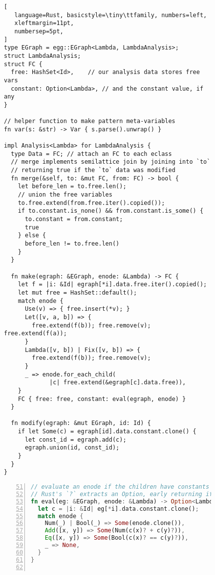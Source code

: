 \begin{figure}
\begin{minipage}[t]{0.49\linewidth}
  \begin{lstlisting}[
   language=Rust, basicstyle=\tiny\ttfamily, numbers=left,
   xleftmargin=11pt,
   numbersep=5pt,
]
type EGraph = egg::EGraph<Lambda, LambdaAnalysis>;
struct LambdaAnalysis;
struct FC {
  free: HashSet<Id>,    // our analysis data stores free vars
  constant: Option<Lambda>, // and the constant value, if any
}

// helper function to make pattern meta-variables
fn var(s: &str) -> Var { s.parse().unwrap() }

impl Analysis<Lambda> for LambdaAnalysis {
  type Data = FC; // attach an FC to each eclass
  // merge implements semilattice join by joining into `to`
  // returning true if the `to` data was modified
  fn merge(&self, to: &mut FC, from: FC) -> bool {
    let before_len = to.free.len();
    // union the free variables
    to.free.extend(from.free.iter().copied());
    if to.constant.is_none() && from.constant.is_some() {
      to.constant = from.constant;
      true
    } else {
      before_len != to.free.len()
    }
  }

  fn make(egraph: &EGraph, enode: &Lambda) -> FC {
    let f = |i: &Id| egraph[*i].data.free.iter().copied();
    let mut free = HashSet::default();
    match enode {
      Use(v) => { free.insert(*v); }
      Let([v, a, b]) => {
        free.extend(f(b)); free.remove(v); free.extend(f(a));
      }
      Lambda([v, b]) | Fix([v, b]) => {
        free.extend(f(b)); free.remove(v);
      }
      _ => enode.for_each_child(
             |c| free.extend(&egraph[c].data.free)),
    }
    FC { free: free, constant: eval(egraph, enode) }
  }

  fn modify(egraph: &mut EGraph, id: Id) {
    if let Some(c) = egraph[id].data.constant.clone() {
      let const_id = egraph.add(c);
      egraph.union(id, const_id);
    }
  }
}\end{lstlisting}
\end{minipage}
\hfill
\begin{minipage}[t]{0.46\linewidth}
  \begin{lstlisting}[language=Rust, basicstyle=\tiny\ttfamily, escapechar=@, numbers=left, firstnumber=51,
   numbersep=7pt,
]
// evaluate an enode if the children have constants
// Rust's `?` extracts an Option, early returning if None
fn eval(eg: &EGraph, enode: &Lambda) -> Option<Lambda> {
  let c = |i: &Id| eg[*i].data.constant.clone();
  match enode {
    Num(_) | Bool(_) => Some(enode.clone()),
    Add([x, y]) => Some(Num(c(x)? + c(y)?)),
    Eq([x, y]) => Some(Bool(c(x)? == c(y)?)),
    _ => None,
  }
}


\end{lstlisting}
\end{minipage}
\end{figure}
